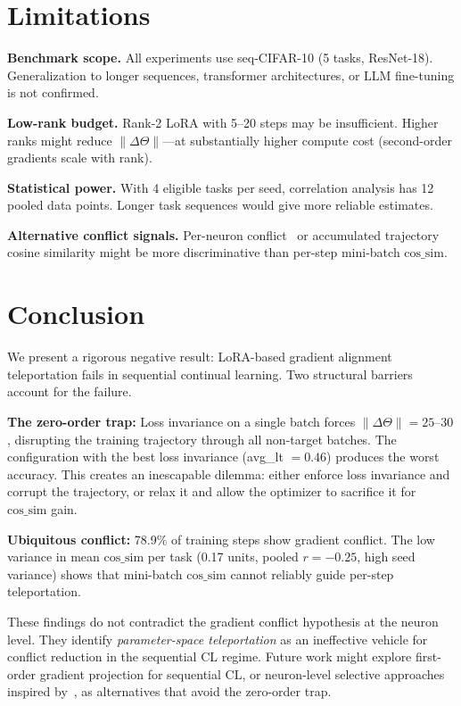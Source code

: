 \documentclass[11pt,a4paper]{article}
\newcommand{\cossim}{\mathrm{cos\_sim}}
\begin{document}
\section{Limitations}
\label{sec:limitations}

\textbf{Benchmark scope.} All experiments use seq-CIFAR-10 (5 tasks, ResNet-18).
Generalization to longer sequences, transformer architectures, or LLM fine-tuning is not confirmed.

\textbf{Low-rank budget.} Rank-2 LoRA with 5--20 steps may be insufficient.
Higher ranks might reduce $\|\Delta\Theta\|$---at substantially higher compute cost
(second-order gradients scale with rank).

\textbf{Statistical power.} With 4 eligible tasks per seed, correlation analysis has
12 pooled data points. Longer task sequences would give more reliable estimates.

\textbf{Alternative conflict signals.} Per-neuron conflict~\citep{liu2026gradconflict}
or accumulated trajectory cosine similarity might be more discriminative than per-step mini-batch $\cossim$.

\section{Conclusion}
\label{sec:conclusion}

We present a rigorous negative result: LoRA-based gradient alignment teleportation fails
in sequential continual learning. Two structural barriers account for the failure.

\textbf{The zero-order trap:} Loss invariance on a single batch forces
$\|\Delta\Theta\| = 25$--$30$, disrupting the training trajectory through all non-target batches.
The configuration with the best loss invariance (avg\_lt $= 0.46$) produces the worst accuracy.
This creates an inescapable dilemma: either enforce loss invariance and corrupt the trajectory,
or relax it and allow the optimizer to sacrifice it for $\cossim$ gain.

\textbf{Ubiquitous conflict:} 78.9\% of training steps show gradient conflict.
The low variance in mean $\cossim$ per task (0.17 units, pooled $r = -0.25$, high seed variance)
shows that mini-batch $\cossim$ cannot reliably guide per-step teleportation.

These findings do not contradict the gradient conflict hypothesis at the neuron level.
They identify \emph{parameter-space teleportation} as an ineffective vehicle for conflict
reduction in the sequential CL regime.
Future work might explore first-order gradient projection for sequential CL,
or neuron-level selective approaches inspired by~\citet{liu2026gradconflict},
as alternatives that avoid the zero-order trap.



\end{document}
